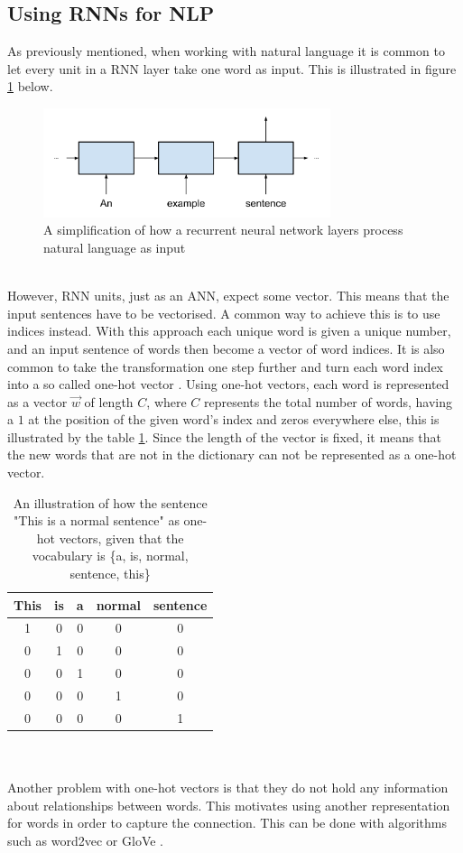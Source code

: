 \subsection{Using RNNs for NLP}\label{sec:rnn_nlp}
As previously mentioned, when working with natural language it is common to let every unit in a RNN layer take one word as input. This is illustrated in figure \ref{fig:sentence_to_rnn} below.
\begin{figure}[h]
    \centering
    \includegraphics[width=0.75\textwidth]{figure/ann/sentence_to_rnn}
    \caption{A simplification of how a recurrent neural network layers process natural language as input}
    \label{fig:sentence_to_rnn}
\end{figure}
\\
However, RNN units, just as an ANN, expect some vector. This means that the input sentences have to be vectorised. A common way to achieve this is to use indices instead. With this approach each unique word is given a unique number, and an input sentence of words then become a vector of word indices. It is also common to take the transformation one step further and turn each word index into a so called one-hot vector \parencite{turian2010word}. Using one-hot vectors, each word is represented as a vector $\vec{w}$ of length $C$, where $C$ represents the total number of words, having a $1$ at the position of the given word's index and zeros everywhere else, this is illustrated by the table \ref{tab:onehot}. Since the length of the vector is fixed, it means that the new words that are not in the dictionary can not be represented as a one-hot vector. 
\begin{table}[h]
    \centering
    \begin{tabular}{c|c|c|c|c}
    This & is & a & normal & sentence\\
    \hline
    1 & 0 & 0 & 0 & 0\\
    0 & 1 & 0 & 0 & 0\\
    0 & 0 & 1 & 0 & 0\\
    0 & 0 & 0 & 1 & 0\\
    0 & 0 & 0 & 0 & 1
    \end{tabular}
    \caption{An illustration of how the sentence "This is a normal sentence" as one-hot vectors, given that the vocabulary is \{a, is, normal, sentence, this\}}
    \label{tab:onehot}
\end{table} 
\\\\
Another problem with one-hot vectors is that they do not hold any information about relationships between words. This motivates using another representation for words in order to capture the connection. This can be done with algorithms such as word2vec \parencite{mikolov2013linguistic} or GloVe \parencite{pennington2014glove}. 